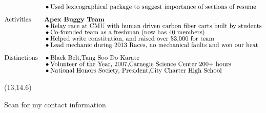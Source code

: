 \documentclass[]{article}
\newcommand{\subpoint}[1]{\bullet \text{\fontsize{10pt}{12pt}\selectfont #1}}
\begin{document}
\begin{align*}
& && \subpoint{Used lexicographical package to suggest importance of sections of resume}\\[.5em]
&\text{Activities} && \textbf{Apex Buggy Team}  \\[-.5em]
& &&\subpoint{Relay race at CMU with human driven carbon fiber carts built by students}\\[-.5em] 
& &&\subpoint{Co-founded team as a freshman (now has 40 members)}\\[-.5em]
& && \subpoint{Helped write constitution, and raised over \$3,000 for team}\\[-.5em]
& &&\subpoint{Lead mechanic during 2013 Races, no mechanical faults and won our heat}\\[.5em]
%
& \text{Distinctions} &&\subpoint{ Black Belt,Tang Soo Do Karate}\\[-.5em]
&  && \subpoint{ Volunteer of the Year, 2007,Carnegie Science Center 200+ hours} \\[-.5em]
& && \subpoint{ National Honors Society, President,City Charter High School} \\
\end{align*}

\begin{textblock}{3}(13,14.6)
\begin{center}
	Scan for my contact information
\end{center}
\end{textblock}



 
\end{document}
